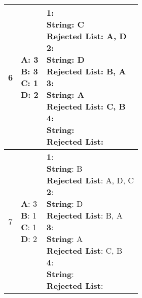 \documentclass{article}
\begin{document}
\begin{center}
\begin{longtable}{ c|l|l }
        6 & \makecell{\textbf{A}: 3 \\ \textbf{B}: 3 \\ \textbf{C}: 1 \\ \textbf{D}: 2} &  
        \makecell{\textbf{1}:\\ \hspace{10mm} \textbf{String}: C \\ \hspace{10mm} \textbf{Rejected List}: A, D \\
                    \textbf{2}:\\ \hspace{10mm} \textbf{String}: D \\ \hspace{10mm} \textbf{Rejected List}: B, A \\
                    \textbf{3}:\\ \hspace{10mm} \textbf{String}: A \\ \hspace{10mm} \textbf{Rejected List}: C, B\\
                    \textbf{4}:\\ \hspace{10mm} \textbf{String}:  \\ \hspace{10mm} \textbf{Rejected List}: \\} \\
        \hline 

        7 & \makecell{\textbf{A}: 3 \\ \textbf{B}: 1 \\ \textbf{C}: 1 \\ \textbf{D}: 2} &  
        \makecell{\textbf{1}:\\ \hspace{10mm} \textbf{String}: B \\ \hspace{10mm} \textbf{Rejected List}: A, D, C \\
                    \textbf{2}:\\ \hspace{10mm} \textbf{String}: D \\ \hspace{10mm} \textbf{Rejected List}: B, A \\
                    \textbf{3}:\\ \hspace{10mm} \textbf{String}: A \\ \hspace{10mm} \textbf{Rejected List}: C, B\\
                    \textbf{4}:\\ \hspace{10mm} \textbf{String}:  \\ \hspace{10mm} \textbf{Rejected List}: \\} \\
        \hline 


\end{longtable}
\end{center}
\end{document}
